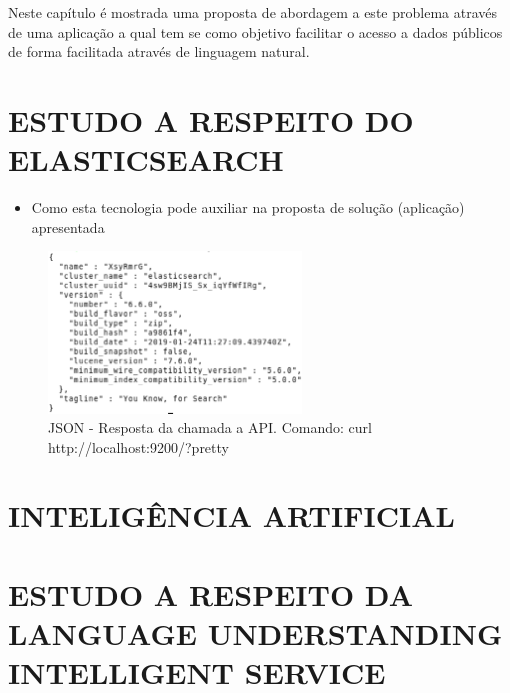 Neste capítulo é mostrada uma proposta de abordagem a este problema através de uma aplicação a qual tem se como objetivo facilitar o acesso a dados públicos de forma facilitada através de linguagem natural.

\section{\uppercase{Estudo a respeito do Elasticsearch}}



\begin{itemize}
	\item Como esta tecnologia pode auxiliar na proposta de solução (aplicação) apresentada
\end{itemize}
\begin{figure}[!htb]
	\caption{\label{fig_grafico}JSON - Resposta da chamada a API. Comando: curl http://localhost:9200/?pretty}
	\begin{center}
		\includegraphics[width=0.6\textwidth]{imagens/pretty.eps}
	\end{center}
\end{figure}

\section{\uppercase{Inteligência Artificial}}


\section{\uppercase{Estudo a respeito da Language Understanding Intelligent Service}}



